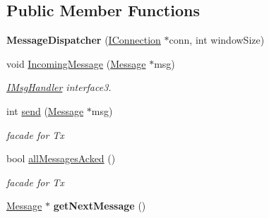 \subsection*{Public Member Functions}
\begin{DoxyCompactItemize}
\item 
\hypertarget{classPseudoTcp_1_1MessageDispatcher_a91ef8930a0d28de5d284b1181ad42076}{
{\bfseries MessageDispatcher} (\hyperlink{classPseudoTcp_1_1IConnection}{IConnection} $\ast$conn, int windowSize)}
\label{classPseudoTcp_1_1MessageDispatcher_a91ef8930a0d28de5d284b1181ad42076}

\item 
\hypertarget{classPseudoTcp_1_1MessageDispatcher_a920a8bb42f0574728a7d672c1fa7cfe5}{
void \hyperlink{classPseudoTcp_1_1MessageDispatcher_a920a8bb42f0574728a7d672c1fa7cfe5}{IncomingMessage} (\hyperlink{classPseudoTcp_1_1Message}{Message} $\ast$msg)}
\label{classPseudoTcp_1_1MessageDispatcher_a920a8bb42f0574728a7d672c1fa7cfe5}

\begin{DoxyCompactList}\small\item\em \hyperlink{classPseudoTcp_1_1IMsgHandler}{IMsgHandler} interface3. \item\end{DoxyCompactList}\item 
\hypertarget{classPseudoTcp_1_1MessageDispatcher_a94b5e3d31894cc9151637e50daa7540d}{
int \hyperlink{classPseudoTcp_1_1MessageDispatcher_a94b5e3d31894cc9151637e50daa7540d}{send} (\hyperlink{classPseudoTcp_1_1Message}{Message} $\ast$msg)}
\label{classPseudoTcp_1_1MessageDispatcher_a94b5e3d31894cc9151637e50daa7540d}

\begin{DoxyCompactList}\small\item\em facade for Tx \item\end{DoxyCompactList}\item 
\hypertarget{classPseudoTcp_1_1MessageDispatcher_a637a302fe06f9abba2cb32f2f9fa7081}{
bool \hyperlink{classPseudoTcp_1_1MessageDispatcher_a637a302fe06f9abba2cb32f2f9fa7081}{allMessagesAcked} ()}
\label{classPseudoTcp_1_1MessageDispatcher_a637a302fe06f9abba2cb32f2f9fa7081}

\begin{DoxyCompactList}\small\item\em facade for Tx \item\end{DoxyCompactList}\item 
\hypertarget{classPseudoTcp_1_1MessageDispatcher_a08b707e4f9c0528b39f1c1eb5b9a61ba}{
\hyperlink{classPseudoTcp_1_1Message}{Message} $\ast$ {\bfseries getNextMessage} ()}
\label{classPseudoTcp_1_1MessageDispatcher_a08b707e4f9c0528b39f1c1eb5b9a61ba}


\end{DoxyCompactItemize}
